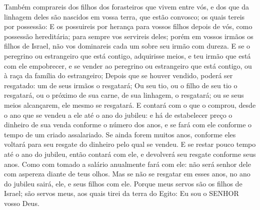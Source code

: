 {Também comprareis dos filhos dos forasteiros que vivem entre vós, e dos que da linhagem deles são nascidos em vossa terra, que estão convosco; os quais tereis por possessão:
E os possuireis por herança para vossos filhos depois de vós, como possessão hereditária; para sempre vos servireis deles; porém em vossos irmãos os filhos de Israel, não vos dominareis cada um sobre seu irmão com dureza.
E se o peregrino ou estrangeiro que está contigo, adquirisse meios, e teu irmão que está com ele empobrecer, e se vender ao peregrino ou estrangeiro que está contigo, ou à raça da família do estrangeiro;
Depois que se houver vendido, poderá ser resgatado: um de seus irmãos o resgatará;
Ou seu tio, ou o filho de seu tio o resgatará, ou o próximo de sua carne, de sua linhagem, o resgatará; ou se seus meios alcançarem, ele mesmo se resgatará.
E contará com o que o comprou, desde o ano que se vendeu a ele até o ano do jubileu: e há de estabelecer preço o dinheiro de sua venda conforme o número dos anos, e se fará com ele conforme o tempo de um criado assalariado.
Se ainda forem muitos anos, conforme eles voltará para seu resgate do dinheiro pelo qual se vendeu.
E se restar pouco tempo até o ano do jubileu, então contará com ele, e devolverá seu resgate conforme seus anos.
Como com tomado a salário anualmente fará com ele: não será senhor dele com aspereza diante de teus olhos.
Mas se não se resgatar em esses anos, no ano do jubileu sairá, ele, e seus filhos com ele.
Porque meus servos são os filhos de Israel; são servos meus, aos quais tirei da terra do Egito: Eu sou o SENHOR vosso Deus.

}
